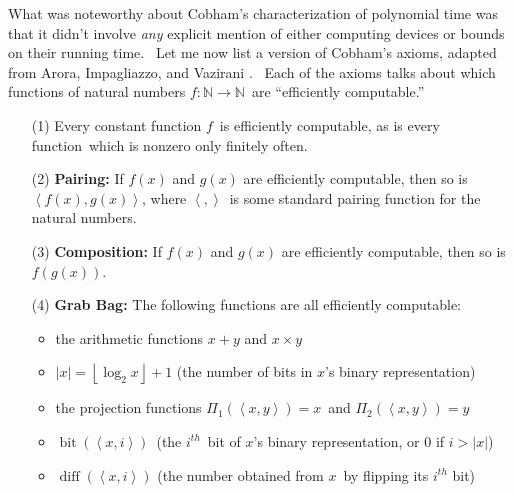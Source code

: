 \documentclass[11pt,onecolumn]{article}%
\begin{document}
What was noteworthy about Cobham's characterization of polynomial time was
that it didn't involve \textit{any} explicit mention of either computing
devices or bounds on their running time. \ Let me now list a version of
Cobham's axioms, adapted from Arora, Impagliazzo, and Vazirani \cite{aiv}.
\ Each of the axioms talks about which functions of natural numbers
$f:\mathbb{N}\rightarrow\mathbb{N}$\ are \textquotedblleft efficiently
computable.\textquotedblright

\begin{enumerate}
\item[(1)] Every constant function $f$\ is efficiently computable, as is every
function\ which is nonzero only finitely often.

\item[(2)] \textbf{Pairing:} If $f\left(  x\right)  $ and $g\left(  x\right)
$ are efficiently computable, then so is $\left\langle f\left(  x\right)
,g\left(  x\right)  \right\rangle $, where $\left\langle ,\right\rangle $\ is
some standard pairing function for the natural numbers.

\item[(3)] \textbf{Composition:} If $f\left(  x\right)  $ and $g\left(
x\right)  $ are efficiently computable, then so is $f\left(  g\left(
x\right)  \right)  $.

\item[(4)] \textbf{Grab Bag:} The following functions are all efficiently computable:

\begin{itemize}
\item the arithmetic functions $x+y$ and $x\times y$

\item $\left\vert x\right\vert =\left\lfloor \log_{2}x\right\rfloor +1$ (the
number of bits in $x$'s binary representation)

\item the projection functions $\Pi_{1}\left(  \left\langle x,y\right\rangle
\right)  =x$\ and $\Pi_{2}\left(  \left\langle x,y\right\rangle \right)  =y$

\item $\operatorname*{bit}\left(  \left\langle x,i\right\rangle \right)
$\ (the $i^{th}$\ bit of $x$'s binary representation, or $0$ if $i>\left\vert
x\right\vert $)

\item $\operatorname*{diff}\left(  \left\langle x,i\right\rangle \right)  $
(the number obtained from $x$\ by flipping its $i^{th}$ bit)


\end{itemize}
\end{enumerate}
\end{document}
